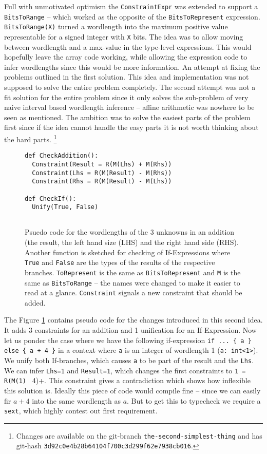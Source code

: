 Full with unmotivated optimism the \verb+ConstraintExpr+ was extended to support a \verb+BitsToRange+ -- which worked as the opposite of the \verb+BitsToRepresent+ expression. \verb+BitsToRange(X)+ turned a wordlength into the maximum positive value representable for a signed integer with \verb+X+ bits. The idea was to allow moving between wordlength and a max-value in the type-level expressions. This would hopefully leave the array code working, while allowing the expression code to infer wordlengths since this would be more information. An attempt at fixing the problems outlined in the first solution. This idea and implementation was not supposed to solve the entire problem completely. The second attempt was not a fit solution for the entire problem since it only solves the sub-problem of very naive interval based wordlength inference -- affine arithmetic was nowhere to be seen as mentioned. The ambition was to solve the easiest parts of the problem first since if the idea cannot handle the easy parts it is not worth thinking about the hard parts.
\cprotect\footnote{Changes are available on the git-branch \verb+the-second-simplest-thing+ and has git-hash \verb+3d92c0e4b28b64104f700c3d299f62e7938cb016+.}

\begin{figure}
\begin{verbatim}
def CheckAddition():
  Constraint(Result = R(M(Lhs) + M(Rhs))
  Constraint(Lhs = R(M(Result) - M(Rhs))
  Constraint(Rhs = R(M(Result) - M(Lhs))

def CheckIf():
  Unify(True, False)
  
\end{verbatim}
  \cprotect\caption{Psuedo code for the wordlengths of the 3 unknowns in an addition (the result, the left hand size (LHS) and the right hand side (RHS). Another function is sketched for checking of If-Expressions where \verb+True+ and \verb+False+ are the types of the results of the respective branches. \verb+ToRepresent+ is the same as \verb+BitsToRepresent+ and \verb+M+ is the same as \verb+BitsToRange+ -- the names were changed to make it easier to read at a glance. \verb+Constraint+ signals a new constraint that should be added.}
\label{fig:SecondAlgo}
\end{figure}

The Figure \ref{fig:SecondAlgo} contains pseudo code for the changes introduced in this second idea. It adds 3 constraints for an addition and 1 unification for an If-Expression. Now let us ponder the case where we have the following if-expression \verb!if ... { a } else { a + 4 }! in a context where \verb+a+ is an integer of wordlength 1 (\verb+a: int<1>+). We unify both If-branches, which causes \verb+a+ to be part of the result and the \verb+Lhs+. We can infer \verb+Lhs=1+ and \verb+Result=1+, which changes the first constraints to \verb+1 = R(M(1) + 4)+. This constraint gives a contradiction which shows how inflexible this solution is. Ideally this piece of code would compile fine -- since we can easily fir $a + 4$ into the same wordlength as $a$. But to get this to typecheck we require a \verb+sext+, which highly contest out first requirement.

